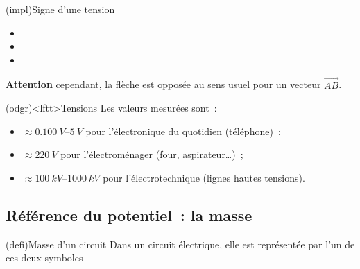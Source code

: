 \documentclass[../../main/main.tex]{subfiles}
\begin{document}
\begin{tcb}[label=impl:tension](impl){Signe d'une tension}
	\begin{itemize}
		\item
		\item
		\item
	\end{itemize}
	\begin{center}
		\textbf{Attention} cependant, la flèche est opposée au sens usuel pour
		un vecteur $\overrightarrow{AB}$.
	\end{center}
\end{tcb}
\begin{tcb}[label=odgr:tensions](odgr)<lftt>{Tensions}
	Les valeurs mesurées sont~:
	\begin{itemize}
		\item $\approx \SIrange{0.100}{5}{V}$ pour l'électronique du
		      quotidien (téléphone)~;
		\item $\approx \SI{220}{V}$ pour l'électroménager (four,
		      aspirateur…)~;
		\item $\approx \SIrange{100}{1000}{kV}$ pour l'électrotechnique
		      (lignes hautes tensions).
	\end{itemize}
\end{tcb}

\subsection{Référence du potentiel~: la masse}

\begin{tcb*}[label=def:masse, sidebyside](defi){Masse d'un circuit}
	\vspace{-15pt}
	\tcblower
	Dans un circuit électrique, elle est représentée par l'un de ces deux
	symboles
	\begin{center}
	\end{center}
\end{tcb*}
\end{document}
